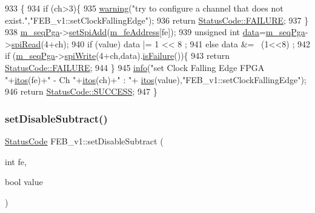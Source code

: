 \begin{DoxyCode}
933                                                                   \{
934   \textcolor{keywordflow}{if} (ch>3)\{
935     \hyperlink{classObject_a65cd4fda577711660821fd2cd5a3b4c9}{warning}(\textcolor{stringliteral}{"try to configure a channel that does not exist."},\textcolor{stringliteral}{"FEB\_v1::setClockFallingEdge"});
936     \textcolor{keywordflow}{return} \hyperlink{classStatusCode_a6f565cbeadc76d14c72f047e5e85eb4ba3da73d4c469762eb9d3c960368252b26}{StatusCode::FAILURE};
937   \}
938   \hyperlink{classFEB__v1_a6c7804ac86796f233a8393043adf2e77}{m\_seqPga}->\hyperlink{classSeqPGA_ac998ce3a6d9b5f2e88cc8393f8c1df53}{setSpiAdd}(\hyperlink{classFEB__v1_a4e1945c2d5b434125f375e9d0fc6d99f}{m\_feAddress}[fe]);
939   \textcolor{keywordtype}{unsigned} \textcolor{keywordtype}{int} \hyperlink{classFEB__v1_a6bca4320bd3bbbc32efc81097f33421a}{data}=\hyperlink{classFEB__v1_a6c7804ac86796f233a8393043adf2e77}{m\_seqPga}->\hyperlink{classSeqPGA_ab3d0e5e5d4014bc7a92588a76b8713d4}{spiRead}(4+ch);
940   \textcolor{keywordflow}{if} (value)  data |= 1 << 8  ;
941   \textcolor{keywordflow}{else}        data &= ~(1<<8) ;
942   \textcolor{keywordflow}{if} (\hyperlink{classFEB__v1_a6c7804ac86796f233a8393043adf2e77}{m\_seqPga}->\hyperlink{classSeqPGA_ad4421841ce4ce8b88ad13f63216f0743}{spiWrite}(4+ch,data).\hyperlink{classStatusCode_a5dd22dc6eb2c52fc4cabc58f6dea2eb7}{isFailure}())\{
943     \textcolor{keywordflow}{return} \hyperlink{classStatusCode_a6f565cbeadc76d14c72f047e5e85eb4ba3da73d4c469762eb9d3c960368252b26}{StatusCode::FAILURE};
944   \}
945   \hyperlink{classObject_a644fd329ea4cb85f54fa6846484b84a8}{info}(\textcolor{stringliteral}{"set Clock Falling Edge FPGA "}+\hyperlink{Tools_8h_af330027dbdafb9a30768b3613c553e60}{itos}(fe)+\textcolor{stringliteral}{" - Ch "}+\hyperlink{Tools_8h_af330027dbdafb9a30768b3613c553e60}{itos}(ch)+\textcolor{stringliteral}{" : "}+
      \hyperlink{Tools_8h_af330027dbdafb9a30768b3613c553e60}{itos}(value),\textcolor{stringliteral}{"FEB\_v1::setClockFallingEdge"});
946   \textcolor{keywordflow}{return} \hyperlink{classStatusCode_a6f565cbeadc76d14c72f047e5e85eb4badd0da38d3ba0d922efd1f4619bc37ad8}{StatusCode::SUCCESS};
947 \}
\end{DoxyCode}
\mbox{\label{classFEB__v1_a067a0aeae34dbd782547afbcd82fc77f}} 
\subsubsection{\texorpdfstring{set\+Disable\+Subtract()}{setDisableSubtract()}}
{\footnotesize\ttfamily \hyperlink{classStatusCode}{Status\+Code} F\+E\+B\+\_\+v1\+::set\+Disable\+Subtract (\begin{DoxyParamCaption}\item[{int}]{fe,  }\item[{bool}]{value }\end{DoxyParamCaption})}



